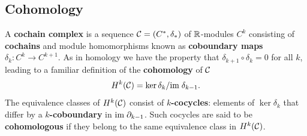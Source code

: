 %
%

\subsection{Cohomology}

A \textbf{cochain complex} is a sequence $\mathcal{C} = (C^*, \delta_*)$ of $\mathbb{R}$-modules $C^k$ consisting of \textbf{cochains} and module homomorphisms known as \textbf{coboundary maps} $\delta_k:C^k\to C^{k+1}$.
As in homology we have the property that $\delta_{k+1}\circ\delta_k = 0$ for all $k$, leading to a familiar definition of the \textbf{cohomology} of $\mathcal{C}$
\[ H^k(\mathcal{C}) = \ker\delta_k/\mathrm{im}\;\delta_{k-1}.\]
The equivalence classes of $H^k(\mathcal{C})$ consist of \textbf{$k$-cocycles}: elements of $\ker\delta_k$ that differ by a \textbf{$k$-coboundary} in $\mathrm{im}\;\partial_{k-1}$.
Such cocycles are said to be \textbf{cohomologous} if they belong to the same equivalence class in $H^k(\mathcal{C})$.

